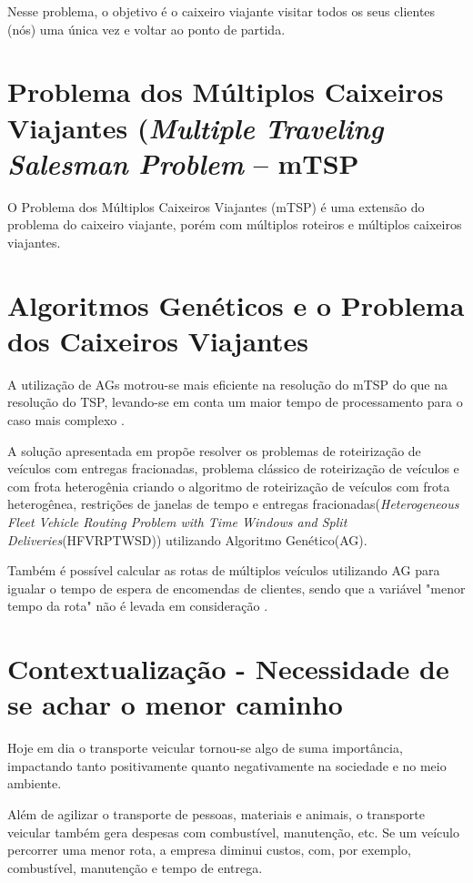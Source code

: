 \documentclass[final,5p,times,twocolumn]{elsarticle}
\begin{document}
	Nesse problema, o objetivo é o caixeiro viajante visitar todos os seus clientes (nós) uma única vez 
	e voltar ao ponto de partida.

\section {Problema dos Múltiplos Caixeiros Viajantes (\textit{Multiple Traveling Salesman Problem } – mTSP}
	O Problema dos Múltiplos Caixeiros Viajantes (mTSP) é uma extensão do problema do caixeiro viajante, 
	porém com múltiplos roteiros e múltiplos caixeiros viajantes\cite{0006-pdf}. 
	

\section {Algoritmos Genéticos e o Problema dos Caixeiros Viajantes}
	
	A utilização de AGs motrou-se mais eficiente na resolução do mTSP do que na resolução do TSP,  
	levando-se em conta um maior tempo de processamento para o caso mais complexo \cite{0005-pdf}.

	A solução apresentada em \cite{0006-pdf} propõe resolver os problemas de roteirização de 
	veículos com entregas fracionadas, problema clássico de roteirização de veículos e com 
	frota heterogênia criando o algoritmo de roteirização de veículos com frota heterogênea, 
	restrições de janelas de tempo e entregas fracionadas(\textit{Heterogeneous Fleet Vehicle 
	Routing Problem with Time Windows and Split Deliveries}(HFVRPTWSD)) utilizando Algoritmo 
	Genético(AG).

	Também é possível calcular as rotas de múltiplos veículos utilizando AG para igualar o tempo 
	de espera de encomendas de clientes, sendo que a variável "menor tempo da rota" não é levada 
	em consideração \cite{0005-pdf}.	

\section {Contextualização - Necessidade de se achar o menor caminho}
	Hoje em dia o transporte veicular tornou-se algo de suma importância, 
	impactando tanto positivamente quanto negativamente na sociedade e no meio ambiente. 
	
	Além de agilizar o transporte de pessoas, materiais e animais, 
	o transporte veicular também gera despesas com combustível, manutenção, etc. 
	Se um veículo percorrer uma menor rota, a empresa diminui custos, com, por exemplo, 
	combustível, manutenção e tempo de entrega.
\end{document}
